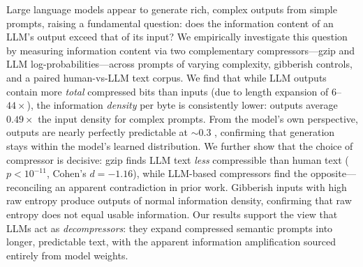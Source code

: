 Large language models appear to generate rich, complex outputs from simple prompts, raising a fundamental question: does the information content of an LLM's output exceed that of its input?
We empirically investigate this question by measuring information content via two complementary compressors---gzip and LLM log-probabilities---across prompts of varying complexity, gibberish controls, and a paired human-vs-LLM text corpus.
We find that while LLM outputs contain more \emph{total} compressed bits than inputs (due to length expansion of $6$--$44\times$), the information \emph{density} per byte is consistently lower: outputs average $0.49\times$ the input density for complex prompts.
From the model's own perspective, outputs are nearly perfectly predictable at ${\sim}0.3$ \bpt, confirming that generation stays within the model's learned distribution.
We further show that the choice of compressor is decisive: gzip finds LLM text \emph{less} compressible than human text ($p < 10^{-11}$, Cohen's $d = -1.16$), while LLM-based compressors find the opposite---reconciling an apparent contradiction in prior work.
Gibberish inputs with high raw entropy produce outputs of normal information density, confirming that raw entropy does not equal usable information.
Our results support the view that LLMs act as \emph{decompressors}: they expand compressed semantic prompts into longer, predictable text, with the apparent information amplification sourced entirely from model weights.
